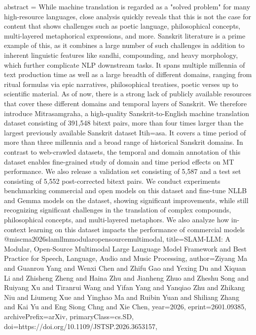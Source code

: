 {      abstract = {While machine translation is regarded as a "solved problem" for many high-resource languages, close analysis quickly reveals that this is not the case for content that shows challenges such as poetic language, philosophical concepts, multi-layered metaphorical expressions, and more. Sanskrit literature is a prime example of this, as it combines a large number of such challenges in addition to inherent linguistic features like sandhi, compounding, and heavy morphology, which further complicate NLP downstream tasks. It spans multiple millennia of text production time as well as a large breadth of different domains, ranging from ritual formulas via epic narratives, philosophical treatises, poetic verses up to scientific material. As of now, there is a strong lack of publicly available resources that cover these different domains and temporal layers of Sanskrit. We therefore introduce Mitrasamgraha, a high-quality Sanskrit-to-English machine translation dataset consisting of 391,548 bitext pairs, more than four times larger than the largest previously available Sanskrit dataset Itih=asa. It covers a time period of more than three millennia and a broad range of historical Sanskrit domains. In contrast to web-crawled datasets, the temporal and domain annotation of this dataset enables fine-grained study of domain and time period effects on MT performance. We also release a validation set consisting of 5,587 and a test set consisting of 5,552 post-corrected bitext pairs. We conduct experiments benchmarking commercial and open models on this dataset and fine-tune NLLB and Gemma models on the dataset, showing significant improvements, while still recognizing significant challenges in the translation of complex compounds, philosophical concepts, and multi-layered metaphors. We also analyze how in-context learning on this dataset impacts the performance of commercial models}
}@misc{ma2026slamllmmodularopensourcemultimodal,
      title={SLAM-LLM: A Modular, Open-Source Multimodal Large Language Model Framework and Best Practice for Speech, Language, Audio and Music Processing}, 
      author={Ziyang Ma and Guanrou Yang and Wenxi Chen and Zhifu Gao and Yexing Du and Xiquan Li and Zhisheng Zheng and Haina Zhu and Jianheng Zhuo and Zheshu Song and Ruiyang Xu and Tiranrui Wang and Yifan Yang and Yanqiao Zhu and Zhikang Niu and Liumeng Xue and Yinghao Ma and Ruibin Yuan and Shiliang Zhang and Kai Yu and Eng Siong Chng and Xie Chen},
      year={2026},
      eprint={2601.09385},
      archivePrefix={arXiv},
      primaryClass={cs.SD},
      doi={https://doi.org/10.1109/JSTSP.2026.3653157},
}
